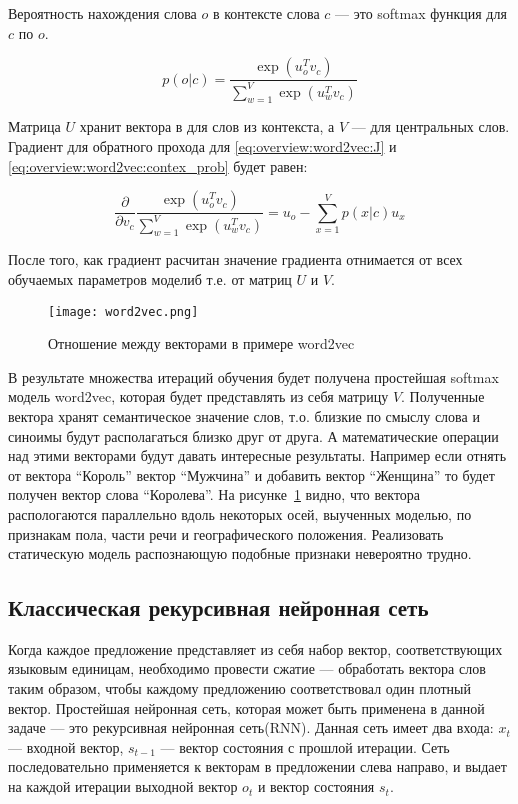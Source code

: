 Вероятность нахождения слова $o$ в контексте слова $c$ --- это softmax функция для $c$ по $o$.


\begin{equation}
  \label{eq:overview:word2vec:contex_prob}
  p(o|c) = \frac{\exp({u_{o}^T}v_{c})}{\sum_{w=1}^{V}\exp({u_w^T}v_{c})}
\end{equation}

Матрица $U$ хранит вектора в для слов из контекста, а $V$ --- для центральных слов.
Градиент для обратного прохода для \ref{eq:overview:word2vec:J} и \ref{eq:overview:word2vec:contex_prob} будет равен:

\begin{equation}
  \frac{\partial }{\partial v_c}\frac{\exp({u_{o}^T}v_{c})}{\sum_{w=1}^{V}\exp({u_w^T}v_{c})} = u_o - \sum_{x=1}^{V}p(x|c)u_x
\end{equation}

После того, как градиент расчитан значение градиента отнимается от всех обучаемых параметров моделиб т.е. от матриц $U$ и $V$.

\begin{figure}[h]
\centering
  \texttt{[image: word2vec.png]}
  \caption{Отношение между векторами в примере word2vec}\label{fig:overview:word2vec}
\end{figure}

В результате множества итераций обучения будет получена простейшая softmax модель word2vec, которая будет представлять из себя матрицу $V$. Полученные вектора хранят семантическое значение слов, т.о. близкие по смыслу слова и синоимы будут располагаться близко друг от друга. А математические операции над этими векторами будут давать интересные результаты. Например если отнять от вектора ``Король'' вектор ``Мужчина'' и добавить вектор ``Женщина'' то будет получен вектор слова ``Королева''. На рисунке~\ref{fig:overview:word2vec} видно, что вектора распологаются параллельно вдоль некоторых осей, выученных моделью, по признакам пола, части речи и географического положения. Реализовать статическую модель распознающую подобные признаки невероятно трудно.

\subsection{Классическая рекурсивная нейронная сеть}\label{subsec:overview:rnn}
Когда каждое предложение представляет из себя набор вектор, соответствующих языковым единицам, необходимо провести сжатие --- обработать вектора слов таким образом, чтобы каждому предложению соответствовал один плотный вектор. Простейшая нейронная сеть, которая может быть применена в данной задаче --- это рекурсивная нейронная сеть(RNN). Данная сеть имеет два входа: $x_{t}$ --- входной вектор, $s_{t-1}$ --- вектор состояния с прошлой итерации. Сеть последовательно применяется к векторам в предложении слева направо, и выдает на каждой итерации выходной вектор $o_{t}$ и вектор состояния $s_t$.

